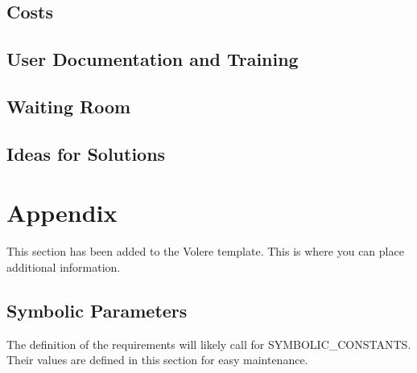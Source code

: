 \documentclass[12pt, titlepage]{article}
\begin{document}
\subsection{Costs}

\subsection{User Documentation and Training}

\subsection{Waiting Room}

\subsection{Ideas for Solutions}





\newpage

\section{Appendix}

This section has been added to the Volere template.  This is where you can place
additional information.

\subsection{Symbolic Parameters}

The definition of the requirements will likely call for SYMBOLIC\_CONSTANTS.
Their values are defined in this section for easy maintenance.
\end{document}

